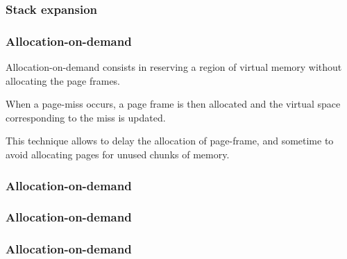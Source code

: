 
\begin{frame}
  \frametitle{Stack expansion}

  \begin{center}
  \end{center}

\end{frame}


\begin{frame}
  \frametitle{Allocation-on-demand}

  Allocation-on-demand consists in reserving a region of virtual
  memory without allocating the page frames.

  \-

  When a page-miss occurs, a page frame is then allocated and the
  virtual space corresponding to the miss is updated.

  \-

  This technique allows to delay the allocation of page-frame, and
  sometime to avoid allocating pages for unused chunks of memory.

\end{frame}


\begin{frame}
  \frametitle{Allocation-on-demand}

  \begin{center}
  \end{center}

\end{frame}



\begin{frame}
  \frametitle{Allocation-on-demand}

  \begin{center}
  \end{center}

\end{frame}



\begin{frame}
  \frametitle{Allocation-on-demand}

  \begin{center}
  \end{center}

\end{frame}


